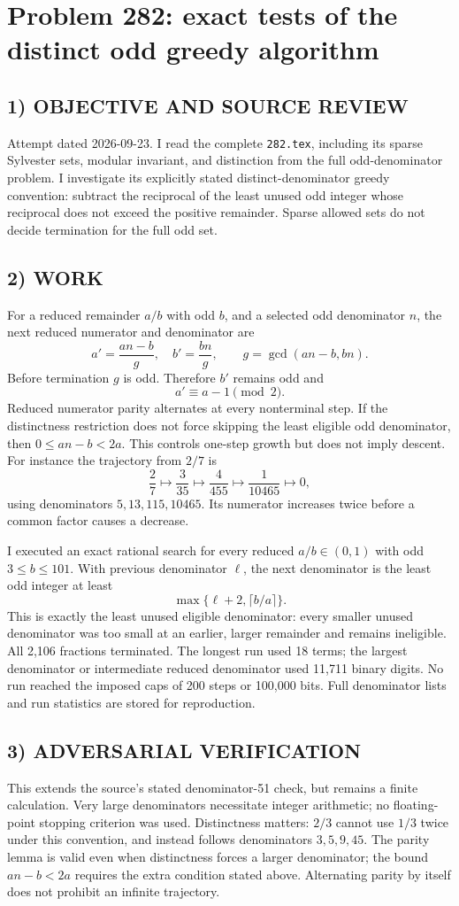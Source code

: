 \section{Problem 282: exact tests of the distinct odd greedy algorithm}
\subsection*{1) OBJECTIVE AND SOURCE REVIEW}
Attempt dated 2026-09-23. I read the complete \texttt{282.tex}, including its sparse Sylvester sets, modular invariant, and distinction from the full odd-denominator problem. I investigate its explicitly stated distinct-denominator greedy convention: subtract the reciprocal of the least unused odd integer whose reciprocal does not exceed the positive remainder. Sparse allowed sets do not decide termination for the full odd set.
\subsection*{2) WORK}
For a reduced remainder $a/b$ with odd $b$, and a selected odd denominator $n$, the next reduced numerator and denominator are
\[
a'=\frac{an-b}{g},\quad b'=\frac{bn}{g},\qquad g=\gcd(an-b,bn).
\]
Before termination $g$ is odd. Therefore $b'$ remains odd and
\[
a'\equiv a-1\pmod2.
\]
Reduced numerator parity alternates at every nonterminal step. If the distinctness restriction does not force skipping the least eligible odd denominator, then $0\le an-b<2a$. This controls one-step growth but does not imply descent. For instance the trajectory from $2/7$ is
\[
\frac27\longmapsto\frac3{35}\longmapsto\frac4{455}
\longmapsto\frac1{10465}\longmapsto0,
\]
using denominators $5,13,115,10465$. Its numerator increases twice before a common factor causes a decrease.

I executed an exact rational search for every reduced $a/b\in(0,1)$ with odd $3\le b\le101$. With previous denominator $\ell$, the next denominator is the least odd integer at least
\[
\max\{\ell+2,\lceil b/a\rceil\}.
\]
This is exactly the least unused eligible denominator: every smaller unused denominator was too small at an earlier, larger remainder and remains ineligible. All 2,106 fractions terminated. The longest run used 18 terms; the largest denominator or intermediate reduced denominator used 11,711 binary digits. No run reached the imposed caps of 200 steps or 100,000 bits. Full denominator lists and run statistics are stored for reproduction.
\subsection*{3) ADVERSARIAL VERIFICATION}
This extends the source's stated denominator-51 check, but remains a finite calculation. Very large denominators necessitate integer arithmetic; no floating-point stopping criterion was used. Distinctness matters: $2/3$ cannot use $1/3$ twice under this convention, and instead follows denominators $3,5,9,45$. The parity lemma is valid even when distinctness forces a larger denominator; the bound $an-b<2a$ requires the extra condition stated above. Alternating parity by itself does not prohibit an infinite trajectory.

